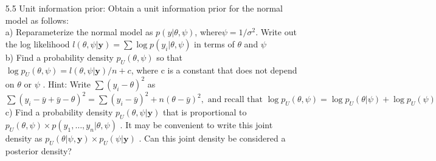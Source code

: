 \documentclass[a4paper]{article}
\begin{document}
\begin{enumerate}
 
 \item[5.5] 
Unit information prior: Obtain a unit information prior for the normal model as follows: \\
a) Reparameterize the normal model as $ p(y | \theta, \psi)$, where$  \psi=1 / \sigma^{2} $.  Write  out the log likelihood $l(\theta, \psi | \boldsymbol{y})=\sum \log p\left(y_{i} | \theta, \psi\right)$ in terms of $ \theta$  and $ \psi $\\
b) Find a probability density $ p_{U}(\theta, \psi)$ so that $ \log p_{U}(\theta, \psi)=l(\theta, \psi | \boldsymbol{y}) / n + c$,  where  c  is a constant that does not depend on $ \theta $ or $ \psi$ . Hint: Write $ \sum\left(y_{i}-\theta\right)^{2}$ as $ \sum\left(y_{i}-\bar{y}+\bar{y}-\theta\right)^{2}=\sum\left(y_{i}-\bar{y}\right)^{2}+n(\theta-\bar{y})^{2}, \text { and recall  that } \log p_{U}(\theta, \psi)=\log p_{U}(\theta | \psi)+\log p_{U}(\psi)$ \\ 
c) Find a probability density $ p_{U}(\theta, \psi | \boldsymbol{y})$  that is proportional to $ p_{U}(\theta, \psi) \times  p\left(y_{1}, \ldots, y_{n} | \theta, \psi\right)$ . It may be convenient to write this joint density as $ p_{U}(\theta | \psi, \boldsymbol{y}) \times p_{U}(\psi | \boldsymbol{y})$  . Can this joint density be considered a posterior  density? 



\end{enumerate}
\end{document}
